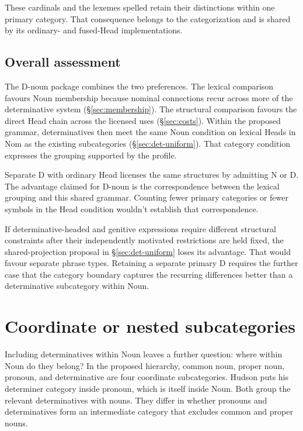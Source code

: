 \documentclass[12pt]{article}
\begin{document}
These cardinals and the lexemes spelled  retain their distinctions within one primary category. That consequence belongs to the categorization and is shared by its ordinary- and fused-Head implementations.

\subsection{Overall assessment}\label{sec:overall-assessment}

The D-noun package combines the two preferences. The lexical comparison favours Noun membership because nominal connections recur across more of the determinative system (§\ref{sec:membership}). The structural comparison favours the direct Head chain across the licensed uses (§\ref{sec:costs}). Within the proposed grammar, determinatives then meet the same Noun condition on lexical Heads in Nom as the existing subcategories (§\ref{sec:det-uniform}). That category condition expresses the grouping supported by the profile.

Separate D with ordinary Head licenses the same structures by admitting N or D. The advantage claimed for D-noun is the correspondence between the lexical grouping and this shared grammar. Counting fewer primary categories or fewer symbols in the Head condition wouldn't establish that correspondence.

If determinative-headed and genitive expressions require different structural constraints after their independently motivated restrictions are held fixed, the shared-projection proposal in §\ref{sec:det-uniform} loses its advantage. That would favour separate phrase types. Retaining a separate primary D requires the further case that the category boundary captures the recurring differences better than a determinative subcategory within Noun.

\section{Coordinate or nested subcategories}\label{sec:inheritance}

Including determinatives within Noun leaves a further question: where within Noun do they belong? In the proposed hierarchy, common noun, proper noun, pronoun, and determinative are four coordinate subcategories. Hudson puts his determiner category inside pronoun, which is itself inside Noun. Both group the relevant determinatives with nouns. They differ in whether pronouns and determinatives form an intermediate category that excludes common and proper nouns.
\end{document}
